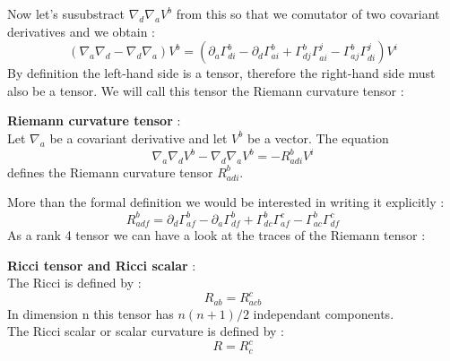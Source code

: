 \documentclass[a4paper,12pt]{article}
\theoremstyle{definition}
\begin{document}
Now let's susubstract $\nabla _d \nabla _a V^b$ from this so that we comutator of two covariant derivatives and we obtain :
\begin{equation}
	(\nabla _a \nabla _d - \nabla _d \nabla _a)V^b=(\partial_a \Gamma^b_{di}-\partial_d \Gamma^b_{ai}+\Gamma^b_{dj}\Gamma^j_{ai}-\Gamma^b_{aj}\Gamma^j_{di})V^i
\end{equation}
By definition the left-hand side is a tensor, therefore the right-hand side must also be a tensor.
We will call this tensor the Riemann curvature tensor :
\begin{definition}
	\textbf{Riemann curvature tensor} :\\
	Let $\nabla_a$ be a covariant derivative and let $V^b$ be a vector. The equation
	\begin{equation}
		\nabla _a \nabla _d V^b - \nabla _d \nabla _aV^b=-R_{adi}^b V^i
	\end{equation}
	defines the Riemann curvature tensor $R_{adi}^b$.
\end{definition}
More than the formal definition we would be interested in writing it explicitly :
\begin{equation} \label{Riemm}
	R_{adf}^b=\partial_d\Gamma^b_{af}-\partial_a\Gamma^b_{df}+\Gamma^b_{dc}\Gamma^c_{af}-\Gamma^b_{ac}\Gamma^c_{df}
\end{equation}
As a rank 4 tensor we can have a look at the traces of the Riemann tensor :
\begin{definition}
	\textbf{Ricci tensor and Ricci scalar} :\\
	The Ricci is defined by :
	\begin{equation}\label{Ricc}
		R_{ab}=R_{acb}^c
	\end{equation}
	In dimension n this tensor has $n(n+1)/2$ independant components.\\
	The Ricci scalar or scalar curvature is defined by :
	\begin{equation}
		R=R_c^c
	\end{equation}
\end{definition}
\end{document}
